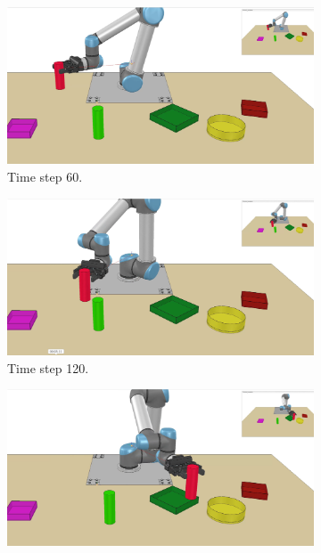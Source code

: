 \begin{figure}
    \bigskip %
    \begin{subfigure}[t]{0.18\textwidth}
        \includegraphics[width=\linewidth]{images/Language_Conditioned_Exp/mine_1.png}
        \caption{Time step 60.}
    \end{subfigure}
    \begin{subfigure}[t]{0.18\textwidth}
        \includegraphics[width=\linewidth]{images/Language_Conditioned_Exp/mine_2.png}
        \caption{Time step 120.}
    \end{subfigure}
    \begin{subfigure}[t]{0.18\textwidth}
        \includegraphics[width=\linewidth]{images/Language_Conditioned_Exp/mine_3.png}

\end{subfigure}
\end{figure}

